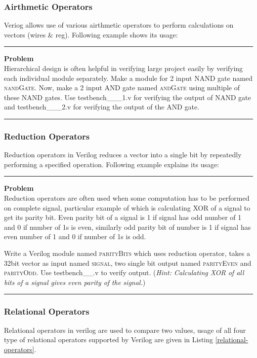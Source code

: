\documentclass[a4paper,10pt]{article}
\newcommand{\ano}{\text{1}}
\theoremstyle{mytheor}
\newcommand{
  \insertverilog}[3]{
  
}
\newcounter{problemNumber}
\newcommand {
  \insertProblem}[1]{
  \vspace{0.5cm}
  \hrule
  \vspace{0.3cm}

  {\color{greatblue}\textbf{\large{Problem \theproblemNumber}}}
  \vspace{2pt}\\#1

  \addtocounter{problemNumber}{1}
  \vspace{0.2cm}
  \hrule  
  \vspace{0.5cm}
}
\begin{document}
\subsubsection*{Airthmetic Operators}
Veriog allows use of various airthmetic operators to perform
calculations on vectors (wires \& reg). Following example shows its
usage:
\insertverilog{./verilog_files/airthmeticOperators.v}{airthmetic-operators}{\text{Functioning
    of airthmetic operator}}

\insertProblem{Hierarchical design is often helpful in verifying large
  project easily by verifying each individual module separately. Make
  a module for 2 input NAND gate named \textsc{nandGate}. Now, make a
  2 input AND gate named \textsc{andGate} using multiple of these NAND
  gates. Use {testbench\_{\ano}\_{\theproblemNumber}\_1.v} for
  verifying the output of NAND gate and
  {testbench\_{\ano}\_{\theproblemNumber}\_2.v} for verifying the
  output of the AND gate.}


\subsubsection*{Reduction Operators}
Reduction operators in Verilog reduces a vector into a single bit by
repeatedly performing a specified operation. Following example
explains its usage:
\insertverilog{./verilog_files/reductionOperators.v}{reduction-operators}{\text{Functioning
    of reduction operator}}

\break \insertProblem { Reduction operators are often used when some
  computation has to be performed on complete signal, particular
  example of which is calculating XOR of a signal to get its parity
  bit. Even parity bit of a signal is 1 if signal has odd number of 1
  and 0 if number of 1s is even, similarly odd parity bit of number
  is 1 if signal has even number of 1 and 0 if number of 1s is odd.

  Write a Verilog module named \textsc{parityBits} which uses
  reduction operator, takes a 32bit vector as input named
  \textsc{signal}, two single bit output named \textsc{parityEven} and
  \textsc{parityOdd}. Use {testbench\_{\ano}\_{\theproblemNumber}.v}
  to verify output. (\textit{Hint: Calculating XOR of all bits of a
    signal gives even parity of the signal.})  }

\subsubsection*{Relational Operators}
Relational operators in verilog are used to compare two values, usage
of all four type of relational operators supported by Verilog are
given in Listing \ref{relational-operators}.
\insertverilog{./verilog_files/relationalOperators.v}{relational-operators}{\text{Functioning
    of relational operator}}
  
\end{document}
